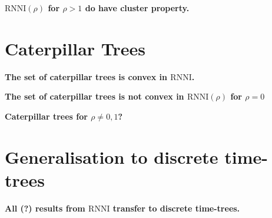 \documentclass[11pt]{amsart}
\newcommand{\rnni}{\mathrm{RNNI}}
\newcommand{\summary}[1]{\textbf{#1}} %
\begin{document}
\summary{$\rnni(\rho)$ for $\rho > 1$ do have cluster property.}

\section{Caterpillar Trees}

\summary{The set of caterpillar trees is convex in $\rnni$.}

\summary{The set of caterpillar trees is not convex in $\rnni(\rho)$ for $\rho = 0$}

\summary{Caterpillar trees for $\rho \neq 0,1$?}


\section{Generalisation to discrete time-trees}

\summary{All (?) results from $\rnni$ transfer to discrete time-trees.}
\end{document}
